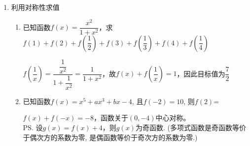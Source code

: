 \begin{enumerate}
\begin{enumerate}
\begin{jieda}
    \end{jieda}
\end{enumerate}
\item 利用对称性求值
\begin{enumerate}
    \item 已知函数$f(x) = \dfrac{x^2}{1+x^2}$，求$f(1)+f(2)+f\left(\dfrac{1}{2}\right) + f(3) + f\left(\dfrac{1}{3}\right) + f(4) + f\left(\dfrac{1}{4}\right)$
    \begin{jieda}
        $f\left(\dfrac{1}{x}\right) = \dfrac{\dfrac{1}{x^2}}{1+\dfrac{1}{x^2}} = \dfrac{1}{1+x^2}$，故$f(x) + f\left(\dfrac{1}{x}\right) = 1$，因此目标值为$\dfrac{7}{2}$
    \end{jieda}
    \item 已知函数$f(x)=x^5+ax^3+bx-4$, 且$f(-2)=10$, 则$f(2)$=
    \begin{jieda}
    $f(x)+f(-x)=-8$，函数关于$(0, -4)$中心对称。\\
    \ps 设$g(x) = f(x)+4$，则$g(x)$为奇函数. (多项式函数是奇函数等价于偶次方的系数为零, 是偶函数等价于奇次方的系数为零.)
    \end{jieda}
    

\end{enumerate}
\end{enumerate}
